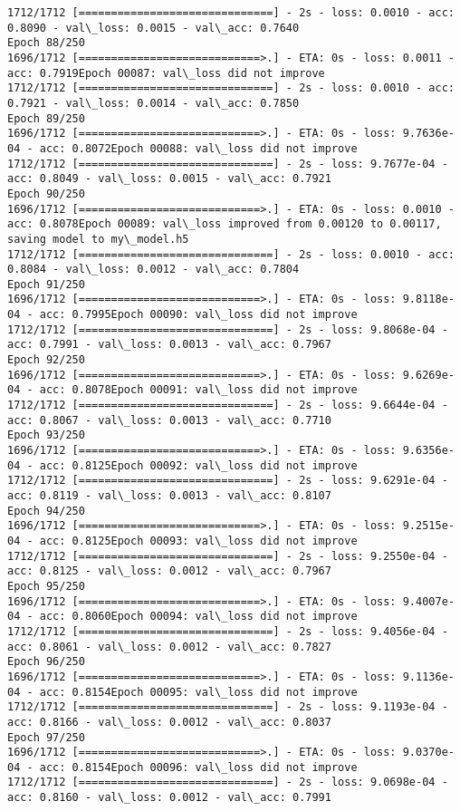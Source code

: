 \documentclass[11pt]{article}
\begin{document}
\begin{Verbatim}[commandchars=\\\{\}]
1712/1712 [==============================] - 2s - loss: 0.0010 - acc: 0.8090 - val\_loss: 0.0015 - val\_acc: 0.7640
Epoch 88/250
1696/1712 [============================>.] - ETA: 0s - loss: 0.0011 - acc: 0.7919Epoch 00087: val\_loss did not improve
1712/1712 [==============================] - 2s - loss: 0.0010 - acc: 0.7921 - val\_loss: 0.0014 - val\_acc: 0.7850
Epoch 89/250
1696/1712 [============================>.] - ETA: 0s - loss: 9.7636e-04 - acc: 0.8072Epoch 00088: val\_loss did not improve
1712/1712 [==============================] - 2s - loss: 9.7677e-04 - acc: 0.8049 - val\_loss: 0.0015 - val\_acc: 0.7921
Epoch 90/250
1696/1712 [============================>.] - ETA: 0s - loss: 0.0010 - acc: 0.8078Epoch 00089: val\_loss improved from 0.00120 to 0.00117, saving model to my\_model.h5
1712/1712 [==============================] - 2s - loss: 0.0010 - acc: 0.8084 - val\_loss: 0.0012 - val\_acc: 0.7804
Epoch 91/250
1696/1712 [============================>.] - ETA: 0s - loss: 9.8118e-04 - acc: 0.7995Epoch 00090: val\_loss did not improve
1712/1712 [==============================] - 2s - loss: 9.8068e-04 - acc: 0.7991 - val\_loss: 0.0013 - val\_acc: 0.7967
Epoch 92/250
1696/1712 [============================>.] - ETA: 0s - loss: 9.6269e-04 - acc: 0.8078Epoch 00091: val\_loss did not improve
1712/1712 [==============================] - 2s - loss: 9.6644e-04 - acc: 0.8067 - val\_loss: 0.0013 - val\_acc: 0.7710
Epoch 93/250
1696/1712 [============================>.] - ETA: 0s - loss: 9.6356e-04 - acc: 0.8125Epoch 00092: val\_loss did not improve
1712/1712 [==============================] - 2s - loss: 9.6291e-04 - acc: 0.8119 - val\_loss: 0.0013 - val\_acc: 0.8107
Epoch 94/250
1696/1712 [============================>.] - ETA: 0s - loss: 9.2515e-04 - acc: 0.8125Epoch 00093: val\_loss did not improve
1712/1712 [==============================] - 2s - loss: 9.2550e-04 - acc: 0.8125 - val\_loss: 0.0012 - val\_acc: 0.7967
Epoch 95/250
1696/1712 [============================>.] - ETA: 0s - loss: 9.4007e-04 - acc: 0.8060Epoch 00094: val\_loss did not improve
1712/1712 [==============================] - 2s - loss: 9.4056e-04 - acc: 0.8061 - val\_loss: 0.0012 - val\_acc: 0.7827
Epoch 96/250
1696/1712 [============================>.] - ETA: 0s - loss: 9.1136e-04 - acc: 0.8154Epoch 00095: val\_loss did not improve
1712/1712 [==============================] - 2s - loss: 9.1193e-04 - acc: 0.8166 - val\_loss: 0.0012 - val\_acc: 0.8037
Epoch 97/250
1696/1712 [============================>.] - ETA: 0s - loss: 9.0370e-04 - acc: 0.8154Epoch 00096: val\_loss did not improve
1712/1712 [==============================] - 2s - loss: 9.0698e-04 - acc: 0.8160 - val\_loss: 0.0012 - val\_acc: 0.7991

\end{Verbatim}
\end{document}
